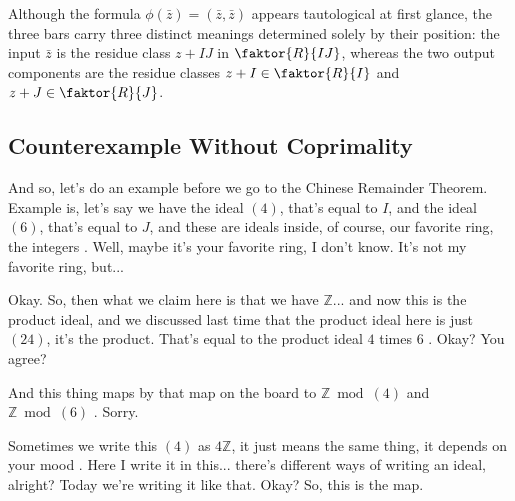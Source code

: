 \begin{insight}
Although the formula $\phi(\bar{z}) = (\bar{z}, \bar{z})$ appears tautological at first glance, the three bars carry three distinct meanings determined solely by their position: the input $\bar{z}$ is the residue class $z + IJ$ in $\faktor{R}{IJ}$, whereas the two output components are the residue classes $z + I \in \faktor{R}{I}$ and $z + J \in \faktor{R}{J}$.
\end{insight}

\subsection{Counterexample Without Coprimality}

\begin{speech}[00:02:30 - 00:03:41]
And so, let's do an example before we go to the Chinese Remainder Theorem. Example is, let's say we have the ideal $(4)$, that's equal to $I$, and the ideal $(6)$, that's equal to $J$, and these are ideals inside, of course, our favorite ring, the integers . Well, maybe it's your favorite ring, I don't know. It's not my favorite ring, but...

Okay. So, then what we claim here is that we have $\mathbb{Z}$... and now this is the product ideal, and we discussed last time that the product ideal here is just $(24)$, it's the product. That's equal to the product ideal $4$ times $6$ . Okay? You agree?

And this thing maps by that map on the board  to $\mathbb{Z} \bmod (4)$ and $\mathbb{Z} \bmod (6)$ . Sorry.

Sometimes we write this $(4)$ as $4\mathbb{Z}$, it just means the same thing, it depends on your mood . Here I write it in this... there's different ways of writing an ideal, alright? Today we're writing it like that. Okay? So, this is the map.
\end{speech}

